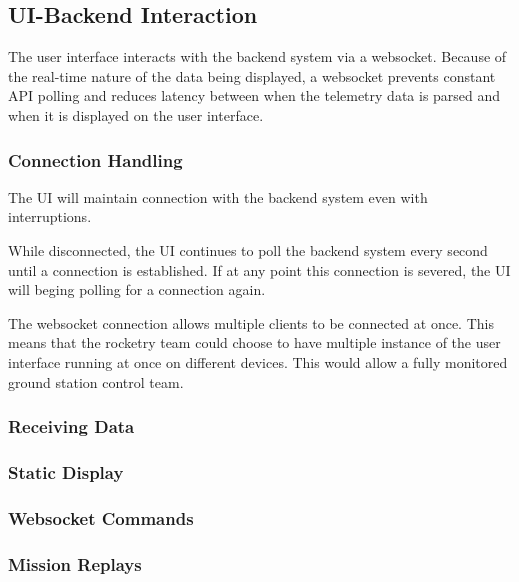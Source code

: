 \subsectionfont{\fontsize{14}{14}\selectfont}
\subsection{UI-Backend Interaction}

The user interface interacts with the backend system via a websocket.
Because of the real-time nature of the data being displayed, a websocket
prevents constant API polling and reduces latency between when the telemetry data is parsed
and when it is displayed on the user interface.

\subsubsection{Connection Handling}
The UI will maintain connection with the backend system even with interruptions.

While disconnected, the UI continues to poll the backend system every second
until a connection is established. If at any point this connection is severed,
the UI will beging polling for a connection again.

The websocket connection allows multiple clients to be connected at once. This means
that the rocketry team could choose to have multiple instance of the user interface
running at once on different devices. This would allow a fully monitored ground station
control team.

\subsubsection{Receiving Data}

\subsubsection{Static Display}

\subsubsection{Websocket Commands}

\subsubsection{Mission Replays}